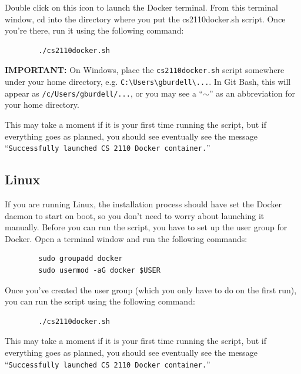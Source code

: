 Double click on this icon to launch the Docker terminal. From this terminal window, cd into the directory where you put the cs2110docker.sh script. Once you’re there, run it using the following command:

\begin{center}
    \begin{verbatim}
        ./cs2110docker.sh
    \end{verbatim}
\end{center}

\textbf{IMPORTANT:} On Windows, place the \texttt{cs2110docker.sh} script somewhere under your home directory, e.g. \texttt{C:\textbackslash{}Users\textbackslash{}gburdell\textbackslash{}...}. In Git Bash, this will appear as \texttt{/c/Users/gburdell/...}, or you may see a ``\texttt{$\sim$}'' as an abbreviation for your home directory.

This may take a moment if it is your first time running the script, but if everything goes as planned, you should see eventually see the message ``\texttt{Successfully launched CS 2110 Docker container.}''

\subsection{Linux}
If you are running Linux, the installation process should have set the Docker daemon to start on boot, so you don’t need to worry about launching it manually. Before you can run the script, you have to set up the user group for Docker. Open a terminal window and run the following commands:

\begin{center}
    \begin{verbatim}
        sudo groupadd docker
        sudo usermod -aG docker $USER
    \end{verbatim}
\end{center}

Once you’ve created the user group (which you only have to do on the first run), you can run the script using the following command:

\begin{center}
    \begin{verbatim}
        ./cs2110docker.sh
    \end{verbatim}
\end{center}

This may take a moment if it is your first time running the script, but if everything goes as planned, you should see eventually see the message ``\texttt{Successfully launched CS 2110 Docker container.}''


